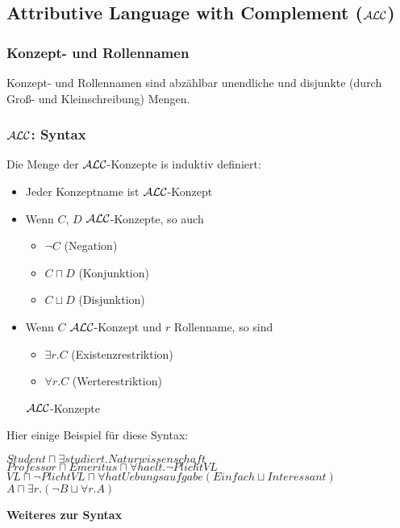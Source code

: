 \subsection{Attributive Language with Complement
(\texorpdfstring{$\mathcal{A}\mathcal{L}\mathcal{C}$}{ALC})}\label{attributive-language-with-complement-alc}

\subsubsection{Konzept- und Rollennamen}\label{konzept--und-rollennamen}

Konzept- und Rollennamen sind abzählbar unendliche und disjunkte (durch Groß- und Kleinschreibung) Mengen.

\subsubsection{\texorpdfstring{$\mathcal{A}\mathcal{L}\mathcal{C}$}{ALC}: Syntax}\label{alcsyntax}

\begin{definition}
  Die Menge der $\mathcal{A}\mathcal{L}\mathcal{C}$-Konzepte is induktiv definiert:
  \begin{itemize}
    \item Jeder Konzeptname ist $\mathcal{A}\mathcal{L}\mathcal{C}$-Konzept
    \item Wenn $C$, $D$ $\mathcal{A}\mathcal{L}\mathcal{C}$-Konzepte, so auch
    \begin{itemize}
      \item $\neg C$ \tabto{2cm}(Negation)
      \item $C \sqcap D$ \tabto{2cm}(Konjunktion)
      \item $C \sqcup D$ \tabto{2cm}(Disjunktion)
    \end{itemize}
    \item {Wenn $C$ $\mathcal{A}\mathcal{L}\mathcal{C}$-Konzept und $r$ Rollenname, so sind
    \begin{itemize}
      \item $\exists r.C$ \tabto{2cm}(Existenzrestriktion)
      \item $\forall r.C$ \tabto{2cm}(Werterestriktion)
    \end{itemize}
    $\mathcal{A}\mathcal{L}\mathcal{C}$-Konzepte}
  \end{itemize}
\end{definition}

\setcounter{tafel}{0}
\begin{tafel}[Beispiel]

Hier einige Beispiel für diese Syntax:

\begin{center}
$Student \sqcap \exists studiert.Naturwissenschaft$ \\
$Professor \sqcap Emeritus \sqcap \forall haelt.\neg PlichtVL$ \\
$VL \sqcap \neg PlichtVL \sqcap \forall hatUebungsaufgabe(Einfach \sqcup Interessant)$ \\
$A \sqcap \exists r.(\neg B \sqcup \forall r.A)$
\end{center}
\end{tafel}
\textbf{Weiteres zur Syntax}


